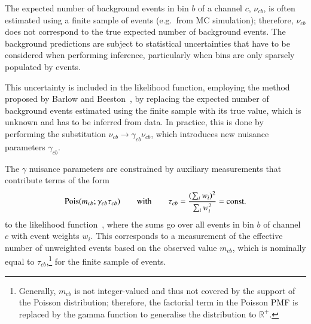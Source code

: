 The expected number of background events in bin $b$ of a channel $c$,
$\nu_{cb}$, is often estimated using a finite sample of events (e.g.\ from MC
simulation); therefore, $\nu_{cb}$ does not correspond to the true expected
number of background events. The background predictions are subject to
statistical uncertainties that have to be considered when performing inference,
particularly when bins are only sparsely populated by events.

This uncertainty is included in the likelihood function, employing the method
proposed by Barlow and Beeston~\cite{barlow1993}, by replacing the expected
number of background events estimated using the finite sample with its true
value, which is unknown and has to be inferred from data. In practice, this is
done by performing the substitution $\nu_{cb} \rightarrow \gamma_{cb} \nu_{cb}$,
which introduces new nuisance parameters $\gamma_{cb}$.
%

The $\gamma$ nuisance parameters are constrained by auxiliary measurements that
contribute terms of the form
\begin{align*}
  \operatorname{Pois}(m_{cb} ; \gamma_{cb} \tau_{cb})
  \qquad \text{with} \qquad
  \tau_{cb} = \frac{( \sum_i w_i )^2}{\sum_i w_i^2} = \text{const.}
\end{align*}
to the likelihood function~\cite{cranmer2012}, where the sums go over all events
in bin $b$ of channel $c$ with event weights $w_i$. This corresponds to a
measurement of the effective number of unweighted events based on the observed
value $m_{cb}$, which is nominally equal to $\tau_{cb}$,\footnote{Generally,
  $m_{cb}$ is not integer-valued and thus not covered by the support of the
  Poisson distribution; therefore, the factorial term in the Poisson PMF is
  replaced by the gamma function to generalise the distribution to
  $\mathbb{R}^+$.} for the finite sample of events.

